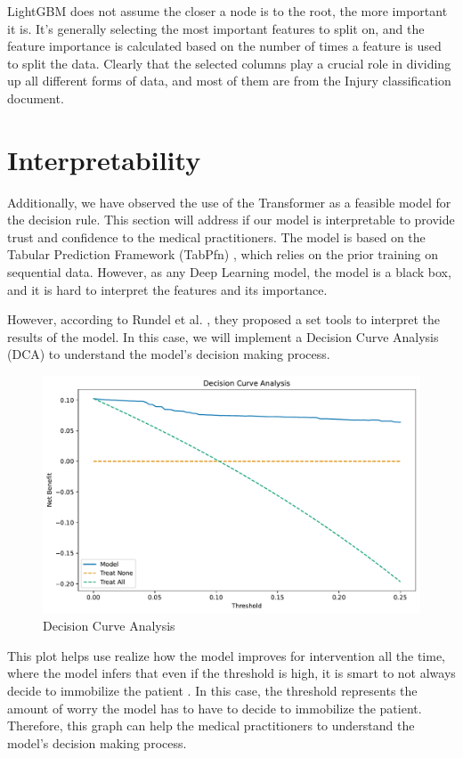 \documentclass[10pt,letterpaper]{article}
\begin{document}
LightGBM does not assume the closer a node is to the root, the more important it is. It's generally selecting the most important features to split on, and the feature importance is calculated based on the number of times a feature is used to split the data. Clearly that the selected columns play a crucial role in dividing up all different forms of data, and most of them are from the Injury classification document. 

\section{Interpretability}

Additionally, we have observed the use of the Transformer as a feasible model for the decision rule. This section will address if our model is interpretable to provide
trust and confidence to the medical practitioners. The model is based on the Tabular Prediction Framework (TabPfn) \cite{hollmann2022tabpfn}, 
which relies on the prior training on sequential data. However, as any Deep Learning model, the model is a black box,
and it is hard to interpret the features and its importance. 

However, according to Rundel et al. \cite{rundel2024interpretable}, they proposed a set tools to interpret the results of the model.
In this case, we will implement a Decision Curve Analysis (DCA) to understand the model's decision making process.

\begin{figure}[H]
    \centering
    \includegraphics[width=0.5\linewidth]{../plots/tabpfn_decision_curve.pdf}
    \caption{Decision Curve Analysis}
    \label{fig:dca}
\end{figure}

This plot helps use realize how the model improves for intervention all the time, where the model infers that even if the threshold is high, it is smart to not 
always decide to immobilize the patient \cite{vickers2019simple}. In this case, the threshold 
represents the amount of worry the model has to have to decide to immobilize the patient. Therefore, this graph 
can help the medical practitioners to understand the model's decision making process.
\end{document}

